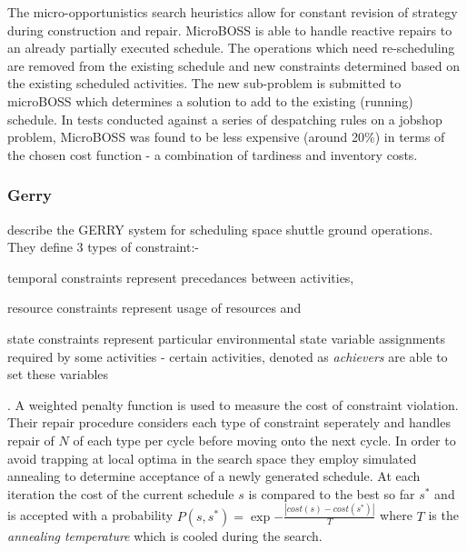  The micro-opportunistics search heuristics allow for constant revision of strategy during construction and repair. MicroBOSS is able to handle reactive repairs to an already partially executed schedule. The operations which need re-scheduling are removed from the existing schedule and new constraints determined based on the existing scheduled activities. The new sub-problem is submitted to microBOSS which determines a solution to add to the existing (running) schedule. In tests conducted against a series of despatching rules on a jobshop problem, MicroBOSS was found to be less expensive (around 20\%) in terms of the chosen cost function - a combination of tardiness and inventory costs. 


\subsubsection{Gerry}
\citet{zweben94scheduling} describe the GERRY system for scheduling space shuttle ground operations. They define 3 types of constraint:- \begin{inparaenum} \item temporal constraints represent precedances between activities, \item resource constraints represent usage of resources and \item state constraints represent particular environmental state variable assignments required by some activities - certain activities, denoted as \emph{achievers} are able to set these variables \end{inparaenum}. A weighted penalty function is used to measure the cost of constraint violation. Their repair procedure considers each type of constraint seperately and handles repair of $N$ of each type per cycle before moving onto the next cycle. In order to avoid trapping at local optima in the search space they employ simulated annealing to determine acceptance of a newly generated schedule. At each iteration the cost of the current schedule $s$ is compared to the best so far $s^*$ and is accepted with a probability $P(s,s^*) = \exp{-\frac{|cost(s)-cost(s^*)|}{T}}$ where $T$ is the \emph{annealing temperature} which is cooled during the search. 

